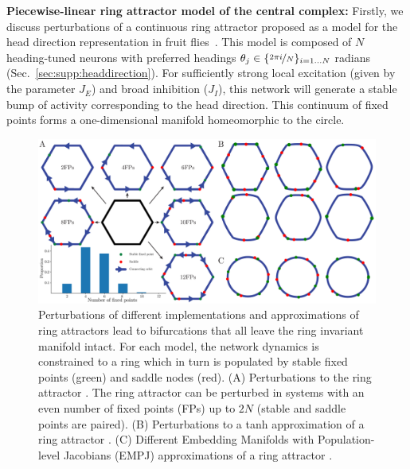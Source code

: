 \documentclass{article} %
\newcommand{\ptitle}[1]{\textbf{#1:}\xspace}
\newcounter{ct}
\theoremstyle{definition}
\theoremstyle{remark}
\begin{document}
\ptitle{Piecewise-linear ring attractor model of the central complex}
Firstly, we discuss perturbations of a continuous ring attractor proposed as a model for the head direction representation in fruit flies~\citep{Noorman2022}.
This model is composed of \(N\) heading-tuned neurons with preferred headings \(\theta_j \in \{\nicefrac{2\pi i}{N}\}_{i=1\dots N}\) radians (Sec.~\ref{sec:supp:headdirection}).
For sufficiently strong local excitation (given by the parameter \(J_E\)) and broad inhibition (\(J_I\)), this network will generate a stable bump of activity corresponding to the head direction.
This continuum of fixed points forms a one-dimensional manifold homeomorphic to the circle.

\begin{figure}[tbhp]
     \centering
  \includegraphics[width=\textwidth]{bio_rings}
       \caption{ Perturbations of different implementations and approximations of ring attractors lead to bifurcations that all leave the ring invariant manifold intact. For each model, the network dynamics is constrained to a ring which in turn is populated by stable fixed points (green) and saddle nodes (red).
       (A) 	Perturbations to the ring attractor \citep{Noorman2022}. The ring attractor can be perturbed in systems with an even number of fixed points (FPs) up to \(2N\) (stable and saddle points are paired).
       (B) 	Perturbations to a tanh approximation of a ring attractor \citep{seeholzer2017efficient}.
       (C) 	Different Embedding Manifolds with Population-level Jacobians (EMPJ) approximations of a ring attractor \citep{pollock2020}.
       }\label{fig:bio_rings}
\end{figure}
\end{document}
